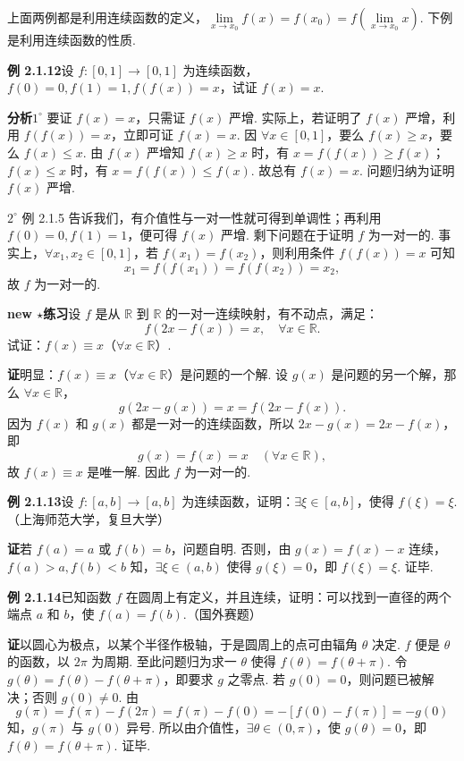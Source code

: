 \documentclass[UTF8,12pt,a4paper,fontset=fandol]{ctexart}
\begin{document}
上面两例都是利用连续函数的定义，$\lim\limits_{x\to x_0}f(x)=f(x_0)=f(\lim\limits_{x\to x_0}x)$. 下例是利用连续函数的性质.

\noindent\textbf{例 2.1.12}\quad 设 $f:[0,1]\to[0,1]$ 为连续函数，$f(0)=0,f(1)=1,f(f(x))=x$，试证 $f(x)=x$.

\noindent\textbf{分析}\quad $1^\circ$ 要证 $f(x)=x$，只需证 $f(x)$ 严增. 实际上，若证明了 $f(x)$ 严增，利用 $f(f(x))=x$，立即可证 $f(x)=x$. 因 $\forall x\in[0,1]$，要么 $f(x)\ge x$，要么 $f(x)\le x$. 由 $f(x)$ 严增知 $f(x)\ge x$ 时，有 $x=f(f(x))\ge f(x)$；$f(x)\le x$ 时，有 $x=f(f(x))\le f(x)$. 故总有 $f(x)=x$. 问题归纳为证明 $f(x)$ 严增.

$2^\circ$ 例 2.1.5 告诉我们，有介值性与一对一性就可得到单调性；再利用 $f(0)=0,f(1)=1$，便可得 $f(x)$ 严增. 剩下问题在于证明 $f$ 为一对一的. 事实上，$\forall x_1,x_2\in[0,1]$，若 $f(x_1)=f(x_2)$，则利用条件 $f(f(x))=x$ 可知
\[
  x_1=f(f(x_1))=f(f(x_2))=x_2,
\]
故 $f$ 为一对一的.

\noindent\textbf{new $\star$练习}\quad 设 $f$ 是从 $\mathbb{R}$ 到 $\mathbb{R}$ 的一对一连续映射，有不动点，满足：
\[
  f(2x-f(x))=x,\quad \forall x\in\mathbb{R}.
\]
试证：$f(x)\equiv x$（$\forall x\in\mathbb{R}$）.

\noindent\textbf{证}\quad 明显：$f(x)\equiv x$（$\forall x\in\mathbb{R}$）是问题的一个解. 设 $g(x)$ 是问题的另一个解，那么 $\forall x\in\mathbb{R}$，
\[
  g(2x-g(x))=x=f(2x-f(x)).
\]
因为 $f(x)$ 和 $g(x)$ 都是一对一的连续函数，所以 $2x-g(x)=2x-f(x)$，即
\[
  g(x)=f(x)=x\quad(\forall x\in\mathbb{R}),
\]
故 $f(x)\equiv x$ 是唯一解. 因此 $f$ 为一对一的.

\noindent\textbf{例 2.1.13}\quad 设 $f:[a,b]\to[a,b]$ 为连续函数，证明：$\exists\xi\in[a,b]$，使得 $f(\xi)=\xi$.（上海师范大学，复旦大学）

\noindent\textbf{证}\quad 若 $f(a)=a$ 或 $f(b)=b$，问题自明. 否则，由 $g(x)=f(x)-x$ 连续，$f(a)>a,f(b)<b$ 知，$\exists\xi\in(a,b)$ 使得 $g(\xi)=0$，即 $f(\xi)=\xi$. 证毕.

\noindent\textbf{例 2.1.14}\quad 已知函数 $f$ 在圆周上有定义，并且连续，证明：可以找到一直径的两个端点 $a$ 和 $b$，使 $f(a)=f(b)$.（国外赛题）

\noindent\textbf{证}\quad 以圆心为极点，以某个半径作极轴，于是圆周上的点可由辐角 $\theta$ 决定. $f$ 便是 $\theta$ 的函数，以 $2\pi$ 为周期. 至此问题归为求一 $\theta$ 使得 $f(\theta)=f(\theta+\pi)$. 令 $g(\theta)=f(\theta)-f(\theta+\pi)$，即要求 $g$ 之零点. 若 $g(0)=0$，则问题已被解决；否则 $g(0)\ne0$. 由
\[
  g(\pi)=f(\pi)-f(2\pi)=f(\pi)-f(0)=-[f(0)-f(\pi)]=-g(0)
\]
知，$g(\pi)$ 与 $g(0)$ 异号. 所以由介值性，$\exists\theta\in(0,\pi)$，使 $g(\theta)=0$，即 $f(\theta)=f(\theta+\pi)$. 证毕.
\end{document}
